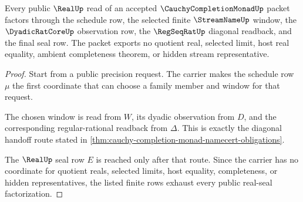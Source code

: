\begin{theorem}
\label{thm:cauchy-completion-monad-public-real-seal-factorization}
Every public $\RealUp$ read of an accepted $\CauchyCompletionMonadUp$ packet factors through the schedule row, the selected finite $\StreamNameUp$ window, the $\DyadicRatCoreUp$ observation row, the $\RegSeqRatUp$ diagonal readback, and the final seal row. The packet exports no quotient real, selected limit, host real equality, ambient completeness theorem, or hidden stream representative.
\end{theorem}
\begin{proof}
Start from a public precision request. The carrier makes the schedule row $\mu$ the first coordinate that can choose a family member and window for that request.

The chosen window is read from $W$, its dyadic observation from $D$, and the corresponding regular-rational readback from $\Delta$. This is exactly the diagonal handoff route stated in \autoref{thm:cauchy-completion-monad-namecert-obligations}.

The $\RealUp$ seal row $E$ is reached only after that route. Since the carrier has no coordinate for quotient reals, selected limits, host equality, completeness, or hidden representatives, the listed finite rows exhaust every public real-seal factorization.
\end{proof}

